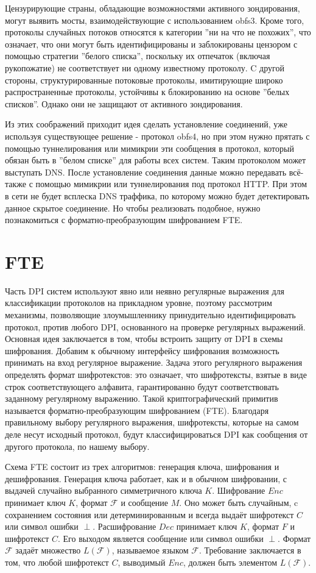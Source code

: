 Цензурирующие страны, обладающие возможностями активного зондирования, могут выявить мосты, взаимодействующие с использованием obfs3.
Кроме того, протоколы случайных потоков относятся к категории ''ни на что не похожих'', что означает,
что они могут быть идентифицированы и заблокированы цензором с помощью стратегии ''белого списка'',
поскольку их отпечаток (включая рукопожатие) не соответствует ни одному известному протоколу.
C другой стороны, структурированные потоковые протоколы, имитирующие широко распространенные протоколы,
устойчивы к блокированию на основе ''белых списков''. Однако они не защищают от активного зондирования.

Из этих соображений приходит идея сделать установление соединений, уже используя существующее решение - протокол obfs4,
но при этом нужно прятать с помощью туннелирования или мимикрии эти сообщения в протокол,
который обязан быть в ''белом списке'' для работы всех систем. Таким протоколом может выступать DNS.
После установление соединения данные можно передавать всё-также с помощью мимикрии или туннелирования под протокол HTTP.
При этом в сети не будет всплеска DNS траффика, по которому можно будет детектировать данное скрытое соединение.
Но чтобы реализовать подобное, нужно познакомиться с форматно-преобразующим шифрованием FTE.

\section{FTE}

Часть DPI систем используют явно или неявно регулярные выражения для классификации протоколов на прикладном уровне,
поэтому рассмотрим механизмы, позволяющие злоумышленнику принудительно идентифицировать протокол, против любого DPI, основанного на проверке регулярных выражений.
Основная идея заключается в том, чтобы встроить защиту от DPI в схемы шифрования.
Добавим к обычному интерфейсу шифрования возможность принимать на вход регулярное выражение.
Задача этого регулярного выражения определять формат шифротекстов: это означает,
что шифротексты, взятые в виде строк соответствующего алфавита, гарантированно будут соответствовать заданному регулярному выражению.
Такой криптографический примитив называется форматно-преобразующим шифрованием (FTE).
Благодаря правильному выбору регулярного выражения, шифротексты, которые на самом деле несут исходный протокол,
будут классифицироваться DPI как сообщения от другого протокола, по нашему выбору.

Схема FTE состоит из трех алгоритмов: генерация ключа, шифрования и дешифрования.
Генерация ключа работает, как и в обычном шифровании, с выдачей случайно выбранного симметричного ключа $K$.
Шифрование $Enc$ принимает ключ $K$, формат $\mathcal{F}$ и сообщение $M$.
Оно может быть случайным, c сохранением состояния или детерминированным и всегда выдаёт шифротекст $C$ или символ ошибки $\perp$.
Расшифрование $Dec$ принимает ключ $K$, формат $F$ и шифротекст $C$. Его выходом является сообщение или символ ошибки $\perp$.
Формат $\mathcal{F}$ задаёт множество $L(\mathcal{F})$, называемое языком $\mathcal{F}$.
Требование заключается в том, что любой шифротекст $C$, выводимый $Enc$, должен быть элементом $L(\mathcal{F})$.

